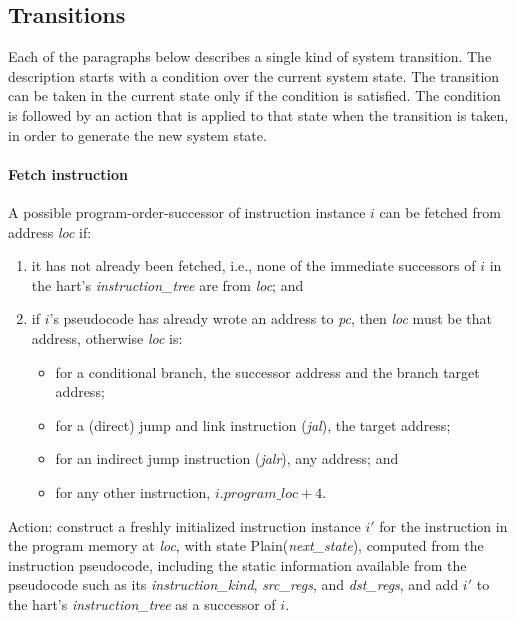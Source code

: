 \subsection{Transitions}\label{sec:omm:transitions}

Each of the paragraphs below describes a single kind of system transition.
The description starts with a condition over the current system state.
The transition can be taken in the current state only if the condition is satisfied.
The condition is followed by an action that is applied to that state when the transition is taken, in order to generate the new system state.

\paragraph{Fetch instruction}\label{omm:fetch}
A possible program-order-successor of instruction instance $i$ can be fetched from address {\it loc} if:
\begin{enumerate}
\item it has not already been fetched, i.e., none of the immediate successors of $i$ in the hart's {\it instruction\_tree} are from {\it loc}; and
\item if $i$'s pseudocode has already wrote an address to {\em pc}, then {\it loc} must be that address, otherwise {\it loc} is:
  \begin{itemize}
  \item for a conditional branch, the successor address and the branch target address;
  \item for a (direct) jump and link instruction ({\em jal}), the target address;
  \item for an indirect jump instruction ({\em jalr}), any address; and
  \item for any other instruction, $i.\textit{program\_loc}+4$.
  \end{itemize}
\end{enumerate}

Action: construct a freshly initialized instruction instance $i'$ for the instruction in the program memory at {\it loc}, with state {\sc Plain}({\it next\_state}), computed from the instruction pseudocode, including the static information available from the pseudocode such as its {\it instruction\_kind}, {\it src\_regs}, and {\it dst\_regs}, and add $i'$ to the hart's {\it instruction\_tree} as a successor of $i$.

